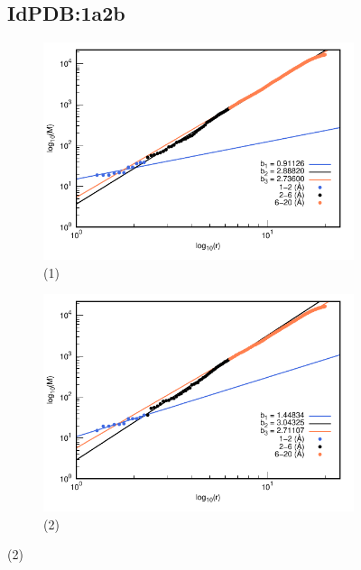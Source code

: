 		\begin{figure}[H]
			\subsection*{IdPDB:1a2b}	
			\hspace{-0.3cm} 
			\begin{subfigure}{0.49\textwidth}
				\centering
				\includegraphics[width=\linewidth,page=1]{graphs/PDBs/1a2b/1a2baddH.pdf}
				\caption{(1)}
			\end{subfigure}
			\hspace{0.2cm}
			\begin{subfigure}{0.49\textwidth}
				\centering
				\includegraphics[width=\linewidth,page=1]{graphs/PDBs/1a2b/1a2bEm.pdf}
				\caption{(2)}
			\end{subfigure}
			

\end{figure}
